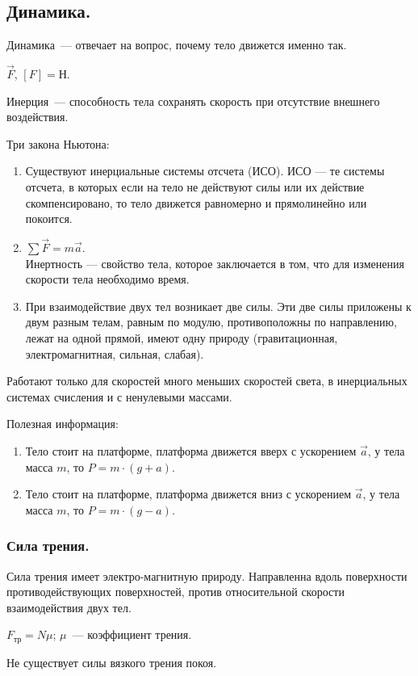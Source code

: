 \documentclass{article}
\begin{document}
	\subsection{Динамика.}
	\begin{definition}
		Динамика~--- отвечает на вопрос, почему тело движется именно так.
	\end{definition}
	\noindent
	$\vec{F}$, $[F] = \text{Н}$.
	\begin{definition}
		Инерция~--- способность тела сохранять скорость при отсутствие внешнего воздействия.
	\end{definition}
	\begin{definition}
		Три закона Ньютона:
		\begin{enumerate}[1.]
			\item Существуют инерциальные системы отсчета (ИСО). ИСО --- те системы отсчета, в которых если на тело не действуют силы или их действие скомпенсировано, то тело движется равномерно и прямолинейно или покоится.
			\item $\sum\vec{F} = m\vec{a}$. \\
			Инертность --- свойство тела, которое заключается в том, что для изменения скорости тела необходимо время.
			\item При взаимодействие двух тел возникает две силы. Эти две силы приложены к двум разным телам, равным по модулю, противоположны по направлению, лежат на одной прямой, имеют одну природу (гравитационная, электромагнитная, сильная, слабая).
		\end{enumerate}
	\end{definition}
	\begin{statement}
		Работают только для скоростей много меньших скоростей света, в инерциальных системах счисления и с ненулевыми массами.
	\end{statement}
	\begin{statement}
		Полезная информация:
		\begin{enumerate}
			\item Тело стоит на платформе, платформа движется вверх с ускорением $\vec{a}$, у тела масса $m$, то $P = m \cdot (g + a)$.
			\item Тело стоит на платформе, платформа движется вниз с ускорением $\vec{a}$, у тела масса $m$, то $P = m \cdot (g - a)$.
		\end{enumerate}
	\end{statement}
	\subsubsection{Сила трения.}
	\begin{definition}
		Сила трения имеет электро-магнитную природу. Направленна вдоль поверхности противодействующих поверхностей, против относительной скорости взаимодействия двух тел.
	\end{definition}
	\begin{definition}
		$F_{\text{тр}} = N\mu$; $\mu$~--- коэффициент трения.
	\end{definition}
	\begin{statement}
		Не существует силы вязкого трения покоя.
	\end{statement}
\end{document}

